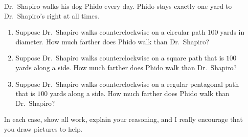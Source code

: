\documentclass[noauthor,hints,nooutcomes,handout,12pt]{ximera}
\begin{document}
\begin{question} %

 
Dr.\ Shapiro walks his dog Phido every day. Phido stays exactly one
yard to Dr.\ Shapiro's right at all times.

\begin{enumerate}
\item Suppose Dr.\ Shapiro walks counterclockwise on a circular path
  $100$ yards in diameter. How much farther does Phido walk than
  Dr.\ Shapiro? 
\item Suppose Dr.\ Shapiro walks counterclockwise on a square path
  that is $100$ yards along a side.  How much farther does Phido walk than
  Dr.\ Shapiro? 
\item Suppose Dr.\ Shapiro walks counterclockwise on a regular
  pentagonal path that is $100$ yards along a side.  How much farther does Phido walk than
  Dr.\ Shapiro? 
\end{enumerate}
In each case, show all work, explain your reasoning, and I really
encourage that you draw pictures to help.


\end{question}
\end{document}
